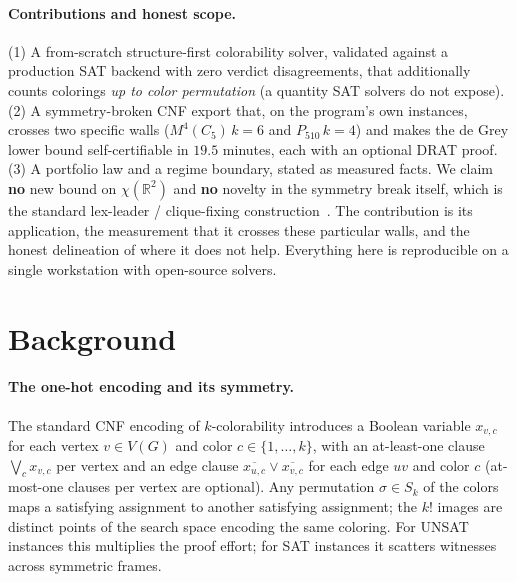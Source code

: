 \documentclass[11pt]{article}
\theoremstyle{definition}
\newcommand{\R}{\mathbb{R}}
\newcommand{\chrom}{\chi}
\begin{document}
\paragraph{Contributions and honest scope.} (1) A from-scratch structure-first
colorability solver, validated against a production SAT backend with zero verdict
disagreements, that additionally counts colorings \emph{up to color permutation}
(a quantity SAT solvers do not expose). (2) A symmetry-broken CNF export that, on
the program's own instances, crosses two specific walls
($M^4(C_5)\,k{=}6$ and $P_{510}\,k{=}4$) and makes the de Grey lower bound
self-certifiable in $19.5$ minutes, each with an optional DRAT proof. (3) A
portfolio law and a regime boundary, stated as measured facts. We claim
\textbf{no} new bound on $\chrom(\R^2)$ and \textbf{no} novelty in the symmetry
break itself, which is the standard lex-leader / clique-fixing
construction~\cite{CrawfordSymmetry1996, SakallahSymmetry2009}. The contribution
is its application, the measurement that it crosses these particular walls, and
the honest delineation of where it does not help. Everything here is reproducible
on a single workstation with open-source solvers.

\section{Background}
\label{sec:background}

\paragraph{The one-hot encoding and its symmetry.} The standard CNF encoding of
$k$-colorability introduces a Boolean variable $x_{v,c}$ for each vertex
$v \in V(G)$ and color $c \in \{1,\dots,k\}$, with an at-least-one clause
$\bigvee_c x_{v,c}$ per vertex and an edge clause
$\overline{x_{u,c}} \vee \overline{x_{v,c}}$ for each edge $uv$ and color $c$
(at-most-one clauses per vertex are optional). Any permutation $\sigma \in S_k$ of
the colors maps a satisfying assignment to another satisfying assignment; the
$k!$ images are distinct points of the search space encoding the same coloring.
For UNSAT instances this multiplies the proof effort; for SAT instances it
scatters witnesses across symmetric frames.
\end{document}
